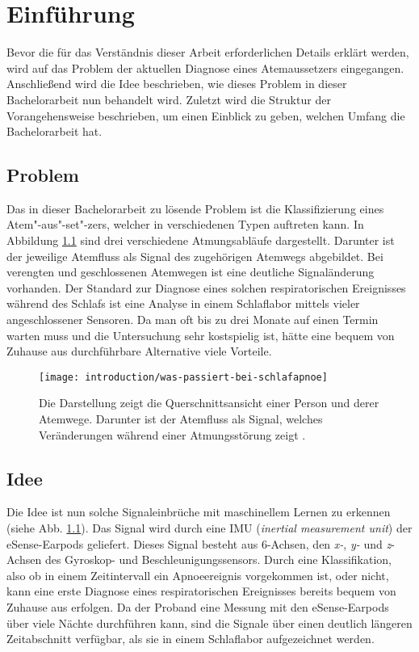 
\chapter{Einführung}
\label{ch:Introduction}
Bevor die für das Verständnis dieser Arbeit erforderlichen Details erklärt werden, wird auf das Problem der aktuellen Diagnose eines Atemaussetzers eingegangen. 
Anschließend wird die Idee beschrieben, wie dieses Problem in dieser Bachelorarbeit nun behandelt wird.
Zuletzt wird die Struktur der Vorangehensweise beschrieben, um einen Einblick zu geben, welchen Umfang die Bachelorarbeit hat.

\section{Problem}
Das in dieser Bachelorarbeit zu lösende Problem ist die Klassifizierung eines Atem"-aus"-set"-zers, welcher in verschiedenen Typen auftreten kann. 
In Abbildung \ref{introduction:problem_description} sind drei verschiedene Atmungsabläufe dargestellt. 
Darunter ist der jeweilige Atemfluss als Signal des zugehörigen Atemwegs abgebildet.
Bei verengten und geschlossenen Atemwegen ist eine deutliche Signaländerung vorhanden. 
Der Standard zur Diagnose eines solchen respiratorischen Ereignisses während des Schlafs ist eine Analyse in einem Schlaflabor mittels vieler angeschlossener Sensoren. 
Da man oft bis zu drei Monate auf einen Termin warten muss und die Untersuchung sehr kostspielig ist, hätte eine bequem von Zuhause aus durchführbare Alternative viele Vorteile.


\begin{figure}[h]
  \centering
  \texttt{[image: introduction/was-passiert-bei-schlafapnoe]}  
  \caption{Die Darstellung zeigt die Querschnittsansicht einer Person und derer Atemwege. Darunter ist der Atemfluss als Signal, welches Veränderungen während einer Atmungsstörung zeigt \cite{DeutscheFamilienversicherungSchlafapnoesyndrom}.}
  \label{introduction:problem_description}
\end{figure}

\newpage

\section{Idee}
Die Idee ist nun solche Signaleinbrüche mit maschinellem Lernen zu erkennen (siehe Abb. \ref{introduction:problem_description}). 
Das Signal wird durch eine IMU (\textit{inertial measurement unit}) der eSense-Earpods geliefert.
Dieses Signal besteht aus 6-Achsen, den \textit{x-}, \textit{y-} und \textit{z}-Achsen des Gyroskop- und Beschleunigungssensors.
Durch eine Klassifikation, also ob in einem Zeitintervall ein Apnoeereignis vorgekommen ist, oder nicht, kann eine erste Diagnose eines respiratorischen Ereignisses bereits bequem von Zuhause aus erfolgen.
Da der Proband eine Messung mit den eSense-Earpods über viele Nächte durchführen kann, sind die Signale über einen deutlich längeren Zeitabschnitt verfügbar, als sie in einem Schlaflabor aufgezeichnet werden.

